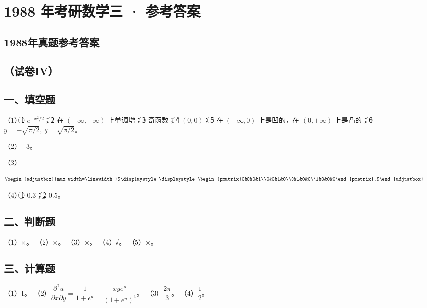 \documentclass[UTF8,12pt]{ctexart}
\newcommand{\fitmath}[1]{\begin{adjustbox}{max width=\linewidth}$\displaystyle #1$\end{adjustbox}}
\begin{document}
\section*{1988 年考研数学三 · 参考答案}
\subsection*{1988年真题参考答案}

\subsection*{（试卷IV）}

\subsection*{一、填空题}

（1）\textcircled{1} \(\displaystyle e^{-x^2/2}\)；\textcircled{2} 在 \(\displaystyle (-\infty,\allowbreak +\infty)\) 上单调增；\textcircled{3} 奇函数；\textcircled{4} \(\displaystyle (0,\allowbreak 0)\)；\textcircled{5} 在 \(\displaystyle (-\infty,\allowbreak 0)\) 上是凹的，在 \(\displaystyle (0,\allowbreak +\infty)\) 上是凸的；\textcircled{6} \(\displaystyle y=-\sqrt{\pi/2},\allowbreak \ y=\sqrt{\pi/2}\)。


（2）\(\displaystyle -3\)。


（3）


\[\fitmath{\displaystyle \begin{pmatrix}0&0&0&1\\0&0&1&0\\0&1&0&0\\1&0&0&0\end{pmatrix}.}\]


（4）\textcircled{1} \(\displaystyle 0.3\)；\textcircled{2} \(\displaystyle 0.5\)。


\subsection*{二、判断题}

（1）×。 （2）×。 （3）×。 （4）√。 （5）×。


\subsection*{三、计算题}

（1）\(\displaystyle 1\)。 （2）\(\displaystyle \dfrac{\displaystyle \partial^2u}{\displaystyle \partial x\partial y}=\dfrac{\displaystyle 1}{\displaystyle 1+e^u}-\dfrac{\displaystyle xye^u}{\displaystyle (1+e^u)^3}\)。 （3）\(\displaystyle \dfrac{\displaystyle 2\pi}{\displaystyle 3}\)。 （4）\(\displaystyle \dfrac{\displaystyle 1}{\displaystyle 2}\)。
\end{document}
